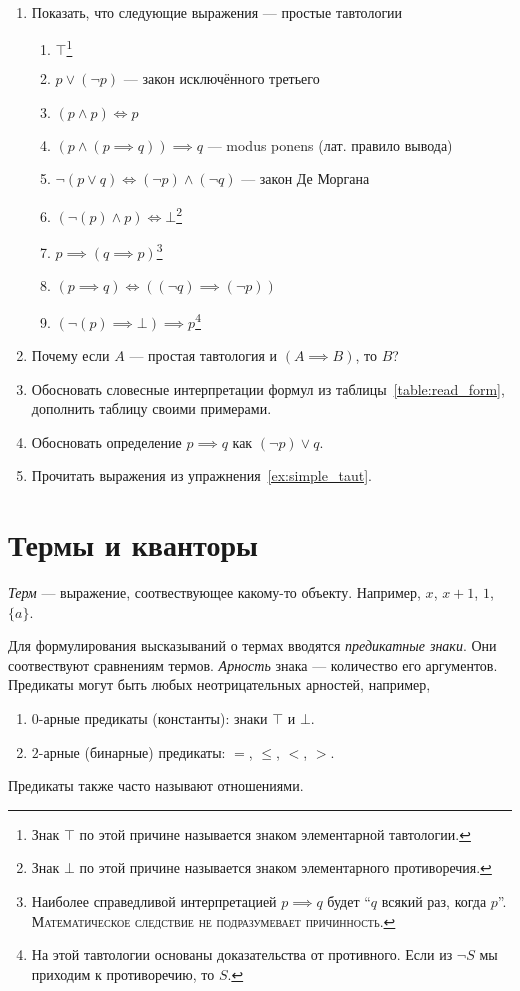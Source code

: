 \begin{enumerate}
	\item{}Показать, что следующие выражения --- простые тавтологии\label{ex:simple_taut}
	\begin{enumerate}
		\item{}$\top$\footnote{Знак $\top$ по этой причине называется
			знаком элементарной тавтологии.}
		\item{}$p\lor (\lnot p)$ --- закон исключённого третьего
		\item{}$(p\land p)\iff p$
		\item{}$(p\land (p\implies q))\implies q$ --- modus ponens (лат. правило вывода)
		\item{}$\lnot(p\lor q)\iff (\lnot p)\land (\lnot q)$ --- закон Де Моргана
		\item{}$(\lnot(p)\land p)\iff\bot$\footnote{
			Знак $\bot$ по этой причине называется
			знаком элементарного противоречия.}
		\item{}$p\implies (q\implies p)$\footnote{
			Наиболее справедливой интерпретацией ${p\implies q}$ будет
			``$q$ всякий раз, когда $p$''.
			\textsc{Математическое следствие не подразумевает причинность.}
		}
		\item{}${(p\implies q)\iff ((\lnot q)\implies (\lnot p))}$
		\item{}$(\lnot(p)\implies\bot)\implies p$\footnote[][1mm]{
			На этой тавтологии основаны
			доказательства от противного. Если из $\lnot S$ мы приходим
			к противоречию, то $S$.}
	\end{enumerate}
	\item{}Почему если $A$ --- простая тавтология и $(A\implies B)$, то $B$?
	\item{}Обосновать словесные интерпретации формул из таблицы~\ref{table:read_form},
	дополнить таблицу своими примерами.
	\item{}Обосновать определение $p\implies q$ как $(\lnot p)\lor q$.
	\item{}Прочитать выражения из упражнения~\ref{ex:simple_taut}.
\end{enumerate}

\pagebreak

\section{Термы и кванторы}

 {\it Терм} --- выражение, соотвествующее какому-то объекту.
Например, $x$, $x+1$, $1$, $\{a\}$.

Для формулирования высказываний о термах вводятся {\it предикатные знаки}.
Они соотвествуют сравнениям термов.
{\it Арность} знака --- количество его аргументов.
Предикаты могут быть любых неотрицательных арностей, например,
\begin{enumerate}
	\item{}$0$-арные предикаты (константы): знаки $\top$ и $\bot$.
	\item{}$2$-арные (бинарные) предикаты: $=$, $\leq$, $<$, $>$.
\end{enumerate}
Предикаты также часто называют отношениями.

